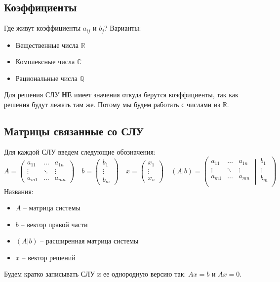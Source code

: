 \documentclass{article}
\begin{document}
\subsection*{Коэффициенты}

Где живут коэффициенты $a_{ij}$ и $b_j$? Варианты:
\begin{itemize}
	\item Вещественные числа $\mathbb R$
	\item Комплексные числа $\mathbb C$
	\item Рациональные числа $\mathbb Q$
\end{itemize}
Для решения СЛУ {\bf НЕ} имеет значения откуда берутся коэффициенты, так как решения будут лежать там же. Потому мы будем работать с числами из $\mathbb R$.

\subsection*{Матрицы связанные со СЛУ}

Для каждой СЛУ введем следующие обозначения:
\[
A= 
\begin{pmatrix}
	a_{11}&\ldots& a_{1n}\\
	\vdots&\ddots&\vdots\\
	a_{m1}& \ldots &a_{mn}
\end{pmatrix}\quad
b = 
\begin{pmatrix}
	b_1\\
	\vdots\\
	b_m
\end{pmatrix} \quad
x =
\begin{pmatrix}
	x_1\\
	\vdots\\
	x_n
\end{pmatrix}\quad
(A|b) =
\left(\left.
\begin{matrix}
	a_{11}&\ldots&a_{1n}\\
	\vdots&\ddots&\vdots\\
	a_{m1}&\ldots&a_{mn}\\
\end{matrix}
\:\right|\:
\begin{matrix}
	b_1\\
	\vdots\\
	b_m\\
\end{matrix}\right)
\]
Названия:
\begin{itemize}
	\item $A$ -- матрица системы
	\item $b$ -- вектор правой части
	\item $(A|b)$ -- расширенная матрица системы
	\item $x$ -- вектор решений
\end{itemize}
Будем кратко записывать СЛУ и ее однородную версию так: $Ax = b$ и $Ax = 0$.
\end{document}
